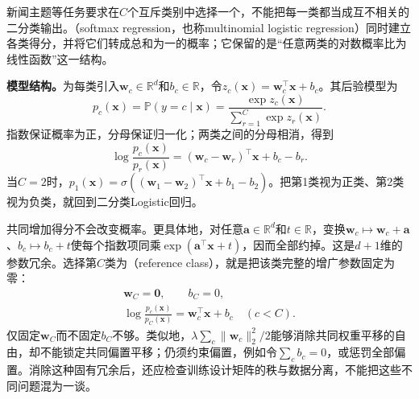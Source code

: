 新闻主题等任务要求在$C$个互斥类别中选择一个，不能把每一类都当成互不相关的二分类输出。（softmax regression，也称multinomial logistic regression）同时建立各类得分，并将它们转成总和为一的概率；它保留的是“任意两类的对数概率比为线性函数”这一结构。

\textbf{模型结构。}为每类引入$\bm{w}_c\in\mathbb{R}^{d}$和$b_c\in\mathbb{R}$，令$z_c(\bm{x})=\bm{w}_c^{\top}\bm{x}+b_c$。其后验模型为
\begin{equation}
  \label{eq:classification-softmax-model}
  p_c(\bm{x})
  =\mathbb{P}(y=c\mid\bm{x})
  =\frac{\exp z_c(\bm{x})}
         {\sum_{r=1}^{C}\exp z_r(\bm{x})}.
\end{equation}
指数保证概率为正，分母保证归一化；两类之间的分母相消，得到
\[
  \log\frac{p_c(\bm{x})}{p_r(\bm{x})}
  =(\bm{w}_c-\bm{w}_r)^{\top}\bm{x}+b_c-b_r.
\]
当$C=2$时，$p_1(\bm{x})=\sigma((\bm{w}_1-\bm{w}_2)^{\top}\bm{x}+b_1-b_2)$。把第1类视为正类、第2类视为负类，就回到二分类Logistic回归。

共同增加得分不会改变概率。更具体地，对任意$\bm{a}\in\mathbb{R}^{d}$和$t\in\mathbb{R}$，变换$\bm{w}_c\mapsto\bm{w}_c+\bm{a}$、$b_c\mapsto b_c+t$使每个指数项同乘$\exp(\bm{a}^{\top}\bm{x}+t)$，因而全部约掉。这是$d+1$维的参数冗余。选择第$C$类为（reference class），就是把该类完整的增广参数固定为零：
\begin{equation}
  \label{eq:classification-softmax-reference}
  \begin{gathered}
    \bm{w}_C=\bm{0},\qquad b_C=0,\\
    \log\frac{p_c(\bm{x})}{p_C(\bm{x})}
    =\bm{w}_c^{\top}\bm{x}+b_c
    \quad(c<C).
  \end{gathered}
\end{equation}
仅固定$\bm{w}_C$而不固定$b_C$不够。类似地，$\lambda\sum_c\lVert\bm{w}_c\rVert_2^2/2$能够消除共同权重平移的自由，却不能锁定共同偏置平移；仍须约束偏置，例如令$\sum_c b_c=0$，或惩罚全部偏置。消除这种固有冗余后，还应检查训练设计矩阵的秩与数据分离，不能把这些不同问题混为一谈。

